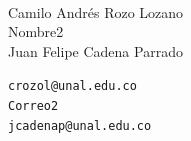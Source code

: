 \begin{center}
\hspace{3.6cm}\dotfill
\Large\hspace{0.001cm} \\
\vspace{0.25cm}
\begin{minipage}{6cm}
    \small{Camilo Andrés Rozo Lozano\\Nombre2\\Juan Felipe Cadena Parrado}
\end{minipage}
\begin{minipage}{5cm}
    \small{\texttt{crozol@unal.edu.co\\Correo2\\jcadenap@unal.edu.co}}
\end{minipage}\\
\vspace{0.25cm}
\hrulefill\\

\end{center}